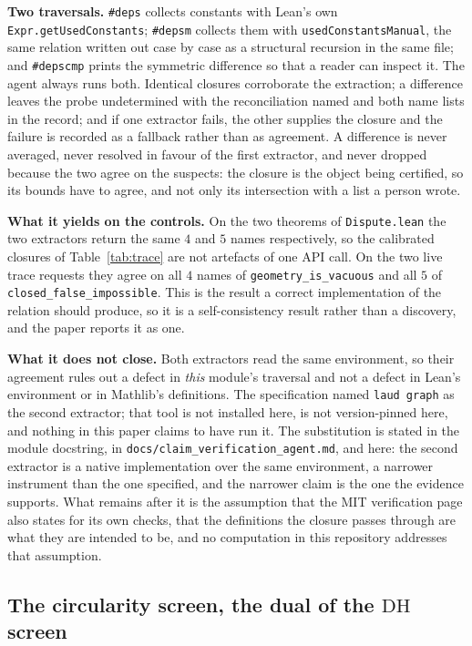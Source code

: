 \documentclass[11pt,a4paper]{article}
\newcommand{\DHf}{\mathrm{DH}}
\newcommand{\verdict}[1]{\textsf{#1}}
\begin{document}
\textbf{Two traversals.} \texttt{\#deps} collects constants with Lean's own
\texttt{Expr.getUsedConstants}; \texttt{\#depsm} collects them with \texttt{usedConstantsManual},
the same relation written out case by case as a structural recursion in the same file; and
\texttt{\#depscmp} prints the symmetric difference so that a reader can inspect it. The agent always
runs both. Identical closures corroborate the extraction; a difference leaves the probe
\verdict{undetermined} with the reconciliation named and both name lists in the record; and if one
extractor fails, the other supplies the closure and the failure is recorded as a fallback rather
than as agreement. A difference is never averaged, never resolved in favour of the first extractor,
and never dropped because the two agree on the suspects: the closure is the object being certified,
so its bounds have to agree, and not only its intersection with a list a person wrote.

\textbf{What it yields on the controls.} On the two theorems of \texttt{Dispute.lean} the
two extractors return the same $4$ and $5$ names respectively, so the calibrated closures of
Table~\ref{tab:trace} are not artefacts of one API call. On the two live trace requests they agree
on all $4$ names of \texttt{geometry\_is\_vacuous} and all $5$ of
\texttt{closed\_false\_impossible}. This is the result a correct implementation of the relation
should produce, so it is a self-consistency result rather than a discovery, and the paper reports it
as one.

\textbf{What it does not close.} Both extractors read the same environment, so their
agreement rules out a defect in \emph{this} module's traversal and not a defect in Lean's
environment or in Mathlib's definitions. The specification named \texttt{laud graph} as the second
extractor; that tool is not installed here, is not version-pinned here, and nothing in this paper
claims to have run it. The substitution is stated in the module docstring, in
\texttt{docs/claim\_verification\_agent.md}, and here: the second extractor is a native
implementation over the same environment, a narrower instrument than the one specified, and the
narrower claim is the one the evidence supports. What remains after it is the assumption that the
MIT verification page also states for its own checks, that the definitions the closure passes
through are what they are intended to be, and no computation in this repository addresses that
assumption.

\subsection{The circularity screen, the dual of the \texorpdfstring{$\DHf$}{DH} screen}
\end{document}
